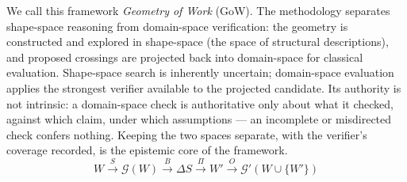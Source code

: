 \documentclass[11pt]{article}
\theoremstyle{gowthm}
\theoremstyle{gowplain}
\begin{document}
We call this framework \emph{Geometry of Work} (GoW). The methodology separates
shape-space reasoning from domain-space verification: the geometry is
constructed and explored in shape-space (the space of structural descriptions),
and proposed crossings are projected back into domain-space for classical
evaluation. Shape-space search is inherently uncertain; domain-space evaluation
applies the strongest verifier available to the projected candidate. Its
authority is not intrinsic: a domain-space check is authoritative only about
what it checked, against which claim, under which assumptions --- an
incomplete or misdirected check confers nothing. Keeping the two spaces
separate, with the verifier's coverage recorded, is the epistemic core of the
framework.
\[
W
\xrightarrow{S}
\mathcal{G}(W)
\xrightarrow{B}
\Delta S
\xrightarrow{\Pi}
W'
\xrightarrow{O}
\mathcal{G}'(W \cup \{W'\})
\]
\end{document}
